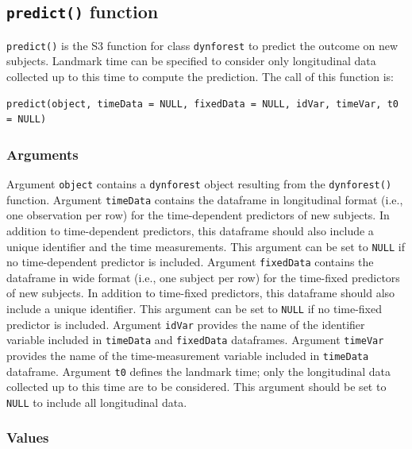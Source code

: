 \subsection{\texorpdfstring{\texttt{predict()} function}{predict() function}}\label{predict-function}

\texttt{predict()} is the S3 function for class \texttt{dynforest} to predict the outcome on new subjects. Landmark time can be specified to consider only longitudinal data collected up to this time to compute the prediction. The call of this function is:

\begin{verbatim}
predict(object, timeData = NULL, fixedData = NULL, idVar, timeVar, t0 = NULL)
\end{verbatim}

\subsubsection{Arguments}\label{arguments-1}

Argument \texttt{object} contains a \texttt{dynforest} object resulting from the \texttt{dynforest()} function. Argument \texttt{timeData} contains the dataframe in longitudinal format (i.e., one observation per row) for the time-dependent predictors of new subjects. In addition to time-dependent predictors, this dataframe should also include a unique identifier and the time measurements. This argument can be set to \texttt{NULL} if no time-dependent predictor is included. Argument \texttt{fixedData} contains the dataframe in wide format (i.e., one subject per row) for the time-fixed predictors of new subjects. In addition to time-fixed predictors, this dataframe should also include a unique identifier. This argument can be set to \texttt{NULL} if no time-fixed predictor is included. Argument \texttt{idVar} provides the name of the identifier variable included in \texttt{timeData} and \texttt{fixedData} dataframes. Argument \texttt{timeVar} provides the name of the time-measurement variable included in \texttt{timeData} dataframe. Argument \texttt{t0} defines the landmark time; only the longitudinal data collected up to this time are to be considered. This argument should be set to \texttt{NULL} to include all longitudinal data.

\subsubsection{Values}\label{values-1}

